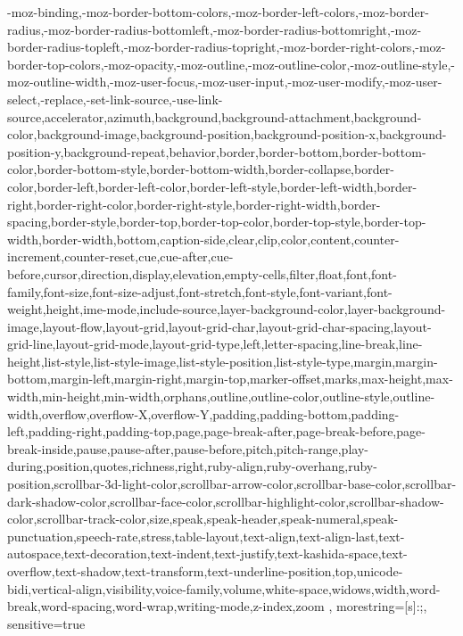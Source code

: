 {{		-moz-binding,-moz-border-bottom-colors,-moz-border-left-colors,-moz-border-radius,-moz-border-radius-bottomleft,-moz-border-radius-bottomright,-moz-border-radius-topleft,-moz-border-radius-topright,-moz-border-right-colors,-moz-border-top-colors,-moz-opacity,-moz-outline,-moz-outline-color,-moz-outline-style,-moz-outline-width,-moz-user-focus,-moz-user-input,-moz-user-modify,-moz-user-select,-replace,-set-link-source,-use-link-source,accelerator,azimuth,background,background-attachment,background-color,background-image,background-position,background-position-x,background-position-y,background-repeat,behavior,border,border-bottom,border-bottom-color,border-bottom-style,border-bottom-width,border-collapse,border-color,border-left,border-left-color,border-left-style,border-left-width,border-right,border-right-color,border-right-style,border-right-width,border-spacing,border-style,border-top,border-top-color,border-top-style,border-top-width,border-width,bottom,caption-side,clear,clip,color,content,counter-increment,counter-reset,cue,cue-after,cue-before,cursor,direction,display,elevation,empty-cells,filter,float,font,font-family,font-size,font-size-adjust,font-stretch,font-style,font-variant,font-weight,height,ime-mode,include-source,layer-background-color,layer-background-image,layout-flow,layout-grid,layout-grid-char,layout-grid-char-spacing,layout-grid-line,layout-grid-mode,layout-grid-type,left,letter-spacing,line-break,line-height,list-style,list-style-image,list-style-position,list-style-type,margin,margin-bottom,margin-left,margin-right,margin-top,marker-offset,marks,max-height,max-width,min-height,min-width,orphans,outline,outline-color,outline-style,outline-width,overflow,overflow-X,overflow-Y,padding,padding-bottom,padding-left,padding-right,padding-top,page,page-break-after,page-break-before,page-break-inside,pause,pause-after,pause-before,pitch,pitch-range,play-during,position,quotes,richness,right,ruby-align,ruby-overhang,ruby-position,scrollbar-3d-light-color,scrollbar-arrow-color,scrollbar-base-color,scrollbar-dark-shadow-color,scrollbar-face-color,scrollbar-highlight-color,scrollbar-shadow-color,scrollbar-track-color,size,speak,speak-header,speak-numeral,speak-punctuation,speech-rate,stress,table-layout,text-align,text-align-last,text-autospace,text-decoration,text-indent,text-justify,text-kashida-space,text-overflow,text-shadow,text-transform,text-underline-position,top,unicode-bidi,vertical-align,visibility,voice-family,volume,white-space,widows,width,word-break,word-spacing,word-wrap,writing-mode,z-index,zoom
	},
	morestring=[s]{:}{;},
	sensitive=true
}

